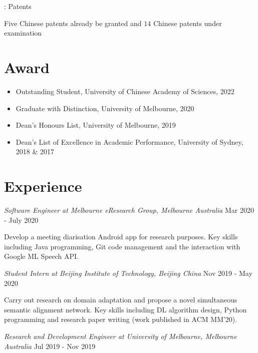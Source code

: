 \documentclass[letterpaper,11pt]{article}
\newcommand{\RNum}[1]{\uppercase\expandafter{\romannumeral #1\relax}}
\begin{document}
\RNum{3}: Patents

\vspace{8pt}

\hspace{6pt} Five Chinese patents already be granted and $14$ Chinese patents under examination

\vspace{1pt}

\section{Award}
\begin{itemize}
  \item Outstanding Student, University of Chinese Academy of Sciences, 2022
  \item Graduate with Distinction, University of Melbourne, 2020
  \item Dean's Honours List, University of Melbourne, 2019
  \item Dean's List of Excellence in Academic Performance, University of Sydney, 2018 \& 2017
\end{itemize}

\vspace{1pt}

\section{Experience}

\textit{Software Engineer at Melbourne eResearch Group, Melbourne Australia} \hfill Mar 2020 - July 2020

Develop a meeting diarisation Android app for research purposes. Key skills including Java programming, Git code management and the interaction with Google ML Speech API. 

\vspace{9pt}

\textit{Student Intern at Beijing Institute of Technology, Beijing China} \hfill Nov 2019 - May 2020

Carry out research on domain adaptation and propose a novel simultaneous semantic alignment network. Key skills including DL algorithm design, Python programming and research paper writing (work published in ACM MM'20). 

\vspace{9pt}

\textit{Research and Development Engineer at University of Melbourne, Melbourne Australia} \hfill Jul 2019 - Nov 2019
\end{document}
